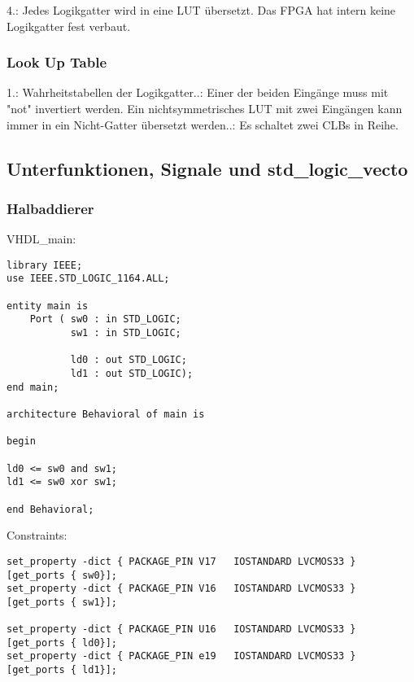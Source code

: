 \documentclass{article}
\begin{document}
4.:\newline 
Jedes Logikgatter wird in eine LUT \"ubersetzt. Das FPGA hat intern keine Logikgatter fest verbaut.

\subsubsection{Look Up Table}
1.: Wahrheitstabellen der Logikgatter..: Einer der beiden Eing\"ange muss mit "not" invertiert werden. Ein nichtsymmetrisches LUT mit zwei Eing\"angen kann immer in ein Nicht-Gatter \"ubersetzt werden..: Es schaltet zwei CLBs in Reihe.

\subsection{Unterfunktionen, Signale und std\_logic\_vecto}
\subsubsection{Halbaddierer}
VHDL\_main:\newline
\begin{verbatim}
library IEEE;
use IEEE.STD_LOGIC_1164.ALL;

entity main is
    Port ( sw0 : in STD_LOGIC;
           sw1 : in STD_LOGIC;

           ld0 : out STD_LOGIC;
           ld1 : out STD_LOGIC);
end main;

architecture Behavioral of main is

begin

ld0 <= sw0 and sw1;
ld1 <= sw0 xor sw1;

end Behavioral;
\end{verbatim}
Constraints:\newline
\begin{verbatim}
set_property -dict { PACKAGE_PIN V17   IOSTANDARD LVCMOS33 } [get_ports { sw0}];
set_property -dict { PACKAGE_PIN V16   IOSTANDARD LVCMOS33 } [get_ports { sw1}];

set_property -dict { PACKAGE_PIN U16   IOSTANDARD LVCMOS33 } [get_ports { ld0}];
set_property -dict { PACKAGE_PIN e19   IOSTANDARD LVCMOS33 } [get_ports { ld1}];
\end{verbatim}
\end{document}
